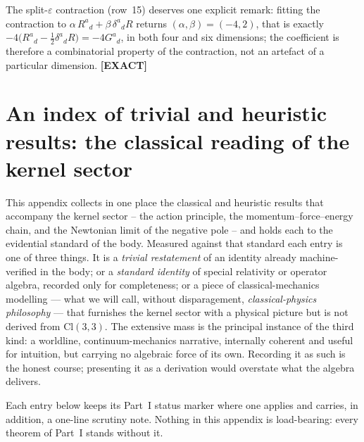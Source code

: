 \documentclass[11pt,oneside]{book}
\newcommand{\Cl}{\mathrm{Cl}}                     %
\newcommand{\status}[1]{{\sffamily\bfseries\color{statuscol}[#1]}}
\theoremstyle{plain}
\theoremstyle{definition}
\theoremstyle{remark}
\begin{document}
The split-$\varepsilon$ contraction (row~15) deserves one explicit remark: fitting the
contraction to $\alpha\,R^a{}_d+\beta\,\delta^a{}_d R$ returns
$(\alpha,\beta)=(-4,2)$, that is exactly
$-4\bigl(R^a{}_d-\tfrac12\delta^a{}_d R\bigr)=-4G^a{}_d$, in both four and six
dimensions; the coefficient is therefore a combinatorial property of the contraction,
not an artefact of a particular dimension. \status{EXACT}


\chapter[An index of trivial and heuristic results]{An index of trivial and heuristic results: the classical reading of the kernel sector}
\label{app:classical-index}

This appendix collects in one place the classical and heuristic results that accompany the
kernel sector -- the action principle, the momentum--force--energy chain, and the Newtonian
limit of the negative pole -- and holds each to the evidential standard of the body. Measured against
that standard each entry is one of three things. It is a \emph{trivial restatement} of an
identity already machine-verified in the body; or a \emph{standard identity} of special
relativity or operator algebra, recorded only for completeness; or a piece of
classical-mechanics modelling --- what we will call, without disparagement,
\emph{classical-physics philosophy} --- that furnishes the kernel sector with a physical
picture but is not derived from $\Cl(3,3)$. The extensive mass is the principal instance of
the third kind: a worldline, continuum-mechanics narrative, internally coherent and useful
for intuition, but carrying no algebraic force of its own. Recording it as such is the
honest course; presenting it as a derivation would overstate what the algebra delivers.

Each entry below keeps its Part~I status marker where one applies and carries, in addition, a
one-line scrutiny note. Nothing in this appendix is load-bearing: every theorem of Part~I
stands without it.
\end{document}
